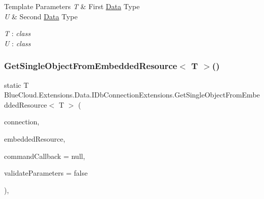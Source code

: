 \begin{DoxyTemplParams}{Template Parameters}
{\em T} & First \mbox{\hyperlink{namespace_blue_cloud_1_1_extensions_1_1_data}{Data}} Type\\
\hline
{\em U} & Second \mbox{\hyperlink{namespace_blue_cloud_1_1_extensions_1_1_data}{Data}} Type\\
\hline
\end{DoxyTemplParams}
\begin{Desc}
\item[Type Constraints]\begin{description}
\item[{\em T} : {\em class}]\item[{\em U} : {\em class}]\end{description}
\end{Desc}
\mbox{\label{class_blue_cloud_1_1_extensions_1_1_data_1_1_i_db_connection_extensions_a20549e54528ba4334ca7113fa68943f2}} 
\subsubsection{\texorpdfstring{Get\+Single\+Object\+From\+Embedded\+Resource$<$ T $>$()}{GetSingleObjectFromEmbeddedResource< T >()}\hspace{0.1cm}{\footnotesize\ttfamily [1/2]}}
{\footnotesize\ttfamily static T Blue\+Cloud.\+Extensions.\+Data.\+I\+Db\+Connection\+Extensions.\+Get\+Single\+Object\+From\+Embedded\+Resource$<$ T $>$ (\begin{DoxyParamCaption}\item[{this I\+Db\+Connection}]{connection,  }\item[{string}]{embedded\+Resource,  }\item[{Action$<$ I\+Db\+Command $>$}]{command\+Callback = {\ttfamily null},  }\item[{bool}]{validate\+Parameters = {\ttfamily false} }\end{DoxyParamCaption})\hspace{0.3cm}{\ttfamily [inline]}, {\ttfamily [static]}}



